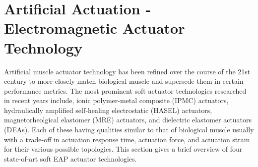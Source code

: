 \section{Artificial Actuation - Electromagnetic Actuator Technology}
\label{sec:Artificial Actuation - Electromagnetic Actuator Technology}
Artificial muscle actuator technology has been refined over the course of the 21st century to more closely match biological muscle and supersede them in certain performance metrics. The most prominent soft actuator technologies researched in recent years include, ionic polymer-metal composite (IPMC) actuators, hydraulically amplified self‐healing electrostatic (HASEL) actuators, magnetorheolgical elastomer (MRE) actuators, and dielectric elastomer actuators (DEAs). Each of these having qualities similar to that of biological muscle usually with a trade-off in actuation response time, actuation force, and actuation strain for their various possible topologies. This section gives a brief overview of four state-of-art soft EAP actuator technologies.

